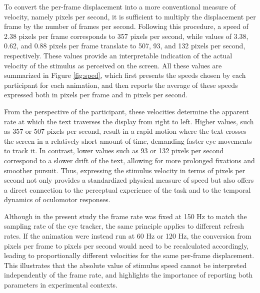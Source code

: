 \documentclass{article}
\begin{document}
To convert the per-frame displacement into a more conventional measure of velocity, namely pixels per second, it is sufficient to multiply the displacement per frame by the number of frames per second. 
Following this procedure, a speed of 2.38 pixels per frame corresponds to 357 pixels per second, while values of 3.38, 0.62, and 0.88 pixels per frame translate to 507, 93, and 132 pixels per second, respectively. 
These values provide an interpretable indication of the actual velocity of the stimulus as perceived on the screen.
All these values are summarized in Figure \ref{fig:sped}, which first presents the speeds chosen by each participant for each animation, and then reports the average of these speeds expressed both in pixels per frame and in pixels per second.

From the perspective of the participant, these velocities determine the apparent rate at which the text traverses the display from right to left. 
Higher values, such as 357 or 507 pixels per second, result in a rapid motion where the text crosses the screen in a relatively short amount of time, demanding faster eye movements to track it. 
In contrast, lower values such as 93 or 132 pixels per second correspond to a slower drift of the text, allowing for more prolonged fixations and smoother pursuit. 
Thus, expressing the stimulus velocity in terms of pixels per second not only provides a standardized physical measure of speed but also offers a direct connection to the perceptual experience of the task and to the temporal dynamics of oculomotor responses.

Although in the present study the frame rate was fixed at 150 Hz to match the sampling rate of the eye tracker, the same principle applies to different refresh rates. 
If the animation were instead run at 60 Hz or 120 Hz, the conversion from pixels per frame to pixels per second would need to be recalculated accordingly, leading to proportionally different velocities for the same per-frame displacement. 
This illustrates that the absolute value of stimulus speed cannot be interpreted independently of the frame rate, and highlights the importance of reporting both parameters in experimental contexts.
\end{document}

